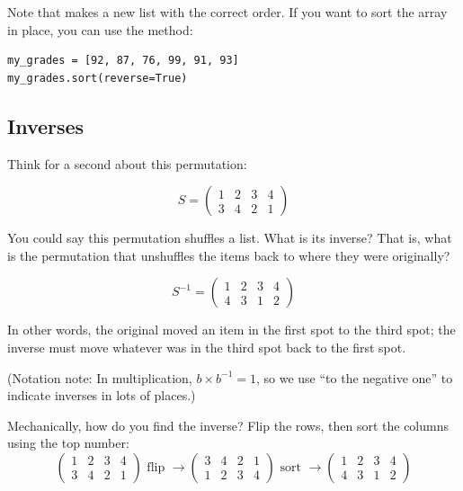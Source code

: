 Note that  makes a new list with the correct
order. If you want to sort the array in place, you can use the
 method:

\begin{verbatim}
my_grades = [92, 87, 76, 99, 91, 93]
my_grades.sort(reverse=True)
\end{verbatim}

\subsection{Inverses}

Think for a second about this permutation:

$$S = \begin{pmatrix}
  1 & 2 & 3 & 4 \\
  3 & 4 & 2 & 1
\end{pmatrix}$$

You could say this permutation shuffles a list.  What is its
inverse? That is, what is the permutation that unshuffles the items
back to where they were originally?

$$S^{-1} = \begin{pmatrix}
  1 & 2 & 3 & 4 \\
  4 & 3 & 1 & 2
\end{pmatrix}$$

In other words, the original moved an item in the first spot to the third
spot; the inverse must move whatever was in the third spot back to
the first spot.

(Notation note: In multiplication, $b \times b^{-1} = 1$, so we
use ``to the negative one'' to indicate inverses in lots of places.)

Mechanically, how do you find the inverse? Flip the rows, then sort the columns using the top number:
$$\begin{pmatrix}
  1 & 2 & 3 & 4 \\
  3 & 4 & 2 & 1
\end{pmatrix}
\text{ flip }\rightarrow
\begin{pmatrix}
  3 & 4 & 2 & 1 \\
  1 & 2 & 3 & 4
\end{pmatrix}
\text{ sort }\rightarrow
\begin{pmatrix}
  1 & 2 & 3 & 4 \\
  4 & 3 & 1 & 2
\end{pmatrix}
$$    


